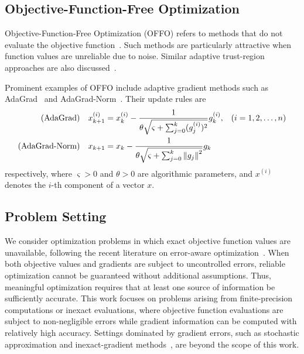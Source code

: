 \documentclass[journal_revised_MPC]{subfiles}
\begin{document}
\subsection{Objective-Function-Free Optimization}
\label{sec:prel_offo}

Objective-Function-Free Optimization (OFFO) refers to methods that do not evaluate the objective function~\citep{Gratton08022024,grattonOFFOMinimizationAlgorithms2023}.
Such methods are particularly attractive when function values are unreliable due to noise.
Similar adaptive trust-region approaches are also discussed~\citep{grapigliaAdaptiveTrustregionMethod2022}.

Prominent examples of OFFO include adaptive gradient methods such as AdaGrad~\citep{duchiAdaptiveSubgradientMethods2011} and AdaGrad-Norm~\citep{wardAdaGradStepsizesSharp2020}.
Their update rules are
\begin{align*}
    \text{(AdaGrad)} \quad x_{k+1}^{(i)}                                      & = x_k^{(i)} -
    \frac{1}{\theta \sqrt{\varsigma + \sum_{j=0}^k (g_j^{(i)})^2}} g_k^{(i)}, &               & (i=1,2,\ldots,n) \\
    \text{(AdaGrad-Norm)} \quad x_{k+1}                                       & = x_k -
    \frac{1}{\theta \sqrt{\varsigma + \sum_{j=0}^k \norm{g_j}^2}} g_k
\end{align*}
respectively, where $\varsigma>0$ and $\theta>0$ are algorithmic parameters, and $x^{(i)}$ denotes the $i$-th component of a vector $x$.

\subsection{Problem Setting}
\label{sec:problem_setting}

We consider optimization problems in which exact objective function values are unavailable, following the recent literature on error-aware optimization~\citep{grattonNoteSolvingNonlinear2020,bellaviaImpactNoiseEvaluation2021,carterNumericalExperienceClass1993,clancyTROPHYTrustRegion2022,sunTrustRegionMethod2023,ruanAdaptiveRegularizedQuasiNewton2024}.
When both objective values and gradients are subject to uncontrolled errors, reliable optimization cannot be guaranteed without additional assumptions.
Thus, meaningful optimization requires that at least one source of information be sufficiently accurate.
This work focuses on problems arising from finite-precision computations or inexact evaluations, where objective function evaluations are subject to non-negligible errors while gradient information can be computed with relatively high accuracy.
Settings dominated by gradient errors, such as stochastic approximation and inexact-gradient methods~\citep{berahasTheoreticalEmpiricalComparison2021,xieAnalysisBFGSMethod2020,shiNoiseTolerantQuasiNewtonAlgorithm2022}, are beyond the scope of this work.
\end{document}
